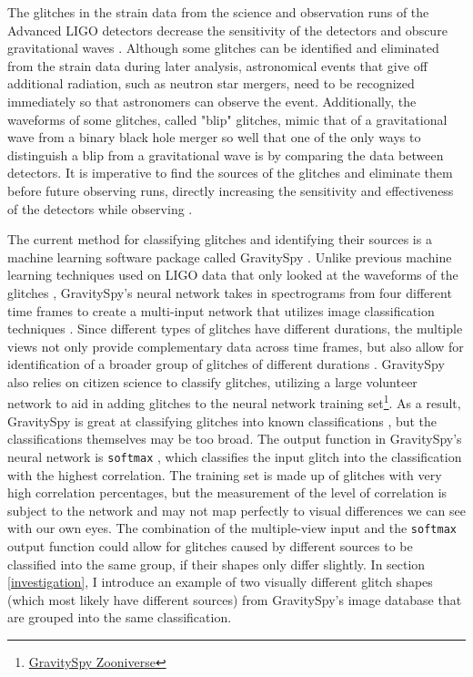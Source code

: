 \documentclass[a4paper]{article}
\begin{document}
The glitches in the strain data from the science and observation runs of the Advanced LIGO detectors decrease the sensitivity of the detectors and obscure gravitational waves \cite{Zevin:2016}. Although some glitches can be identified and eliminated from the strain data during later analysis, astronomical events that give off additional radiation, such as neutron star mergers, need to be recognized immediately so that astronomers can observe the event. Additionally, the waveforms of some glitches, called "blip" glitches, mimic that of a gravitational wave from a binary black hole merger so well that one of the only ways to distinguish a blip from a gravitational wave is by comparing the data between detectors. It is imperative to find the sources of the glitches and eliminate them before future observing runs, directly increasing the sensitivity and effectiveness of the detectors while observing \cite{Mukherjee:2010}. 

The current method for classifying glitches and identifying their sources is a machine learning software package called GravitySpy \cite{Zevin:2016}. Unlike previous machine learning techniques used on LIGO data that only looked at the waveforms of the glitches \cite{Mukherjee:2010}, GravitySpy's neural network takes in spectrograms from four different time frames to create a multi-input network that utilizes image classification techniques \cite{Bahaadini:2017}. Since different types of glitches have different durations, the multiple views not only provide complementary data across time frames, but also allow for identification of a broader group of glitches of different durations \cite{Bahaadini:2017}. GravitySpy also relies on citizen science to classify glitches, utilizing a large volunteer network to aid in adding glitches to the neural network training set\footnote{\href{https://www.zooniverse.org/projects/zooniverse/gravity-spy}{GravitySpy Zooniverse}}. As a result, GravitySpy is great at classifying glitches into known classifications \cite{Zevin:2016}, but the classifications themselves may be too broad. The output function in GravitySpy's neural network is \texttt{softmax} \cite{Bahaadini:2017}, which classifies the input glitch into the classification with the highest correlation. The training set is made up of glitches with very high correlation percentages, but the measurement of the level of correlation is subject to the network and may not map perfectly to visual differences we can see with our own eyes. The combination of the multiple-view input and the \texttt{softmax} output function could allow for glitches caused by different sources to be classified into the same group, if their shapes only differ slightly. In section \ref{investigation}, I introduce an example of two visually different glitch shapes (which most likely have different sources) from GravitySpy's image database that are grouped into the same classification. 
\end{document}
